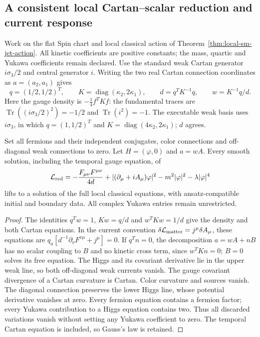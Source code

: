 \subsection{A consistent local Cartan--scalar reduction and current response}
\label{sec:cartan-scalar-reduction}

Work on the flat Spin chart and local classical action of
Theorem~\ref{thm:local-sm-jet-action}. All kinetic coefficients are positive
constants; the mass, quartic and Yukawa coefficients remain declared. Use
the standard weak Cartan generator $i\sigma_3/2$ and central generator $i$.
Writing the two real Cartan connection coordinates as $a=(a_2,a_1)$ gives
\[
 q=(1/2,1/2)^T,\qquad K=\operatorname{diag}(\kappa_2,2\kappa_1),\qquad
 d=q^TK^{-1}q,\qquad w=K^{-1}q/d.
\]
Here the gauge density is $-\tfrac14 f^TKf$: the fundamental traces are
$\operatorname{Tr}((i\sigma_3/2)^2)=-1/2$ and $\operatorname{Tr}(i^2)=-1$.
The executable weak basis uses $i\sigma_3$, in which
$q=(1,1/2)^T$ and $K=\operatorname{diag}(4\kappa_2,2\kappa_1)$; $d$ agrees.

\begin{theorem}
\label{thm:cartan-scalar-reduction}
Set all fermions and their independent conjugates, color connections and
off-diagonal weak connections to zero. Let $H=(\varphi,0)$ and $a=wA$.
Every smooth solution, including the temporal gauge equation, of
\begin{equation}
 \mathcal L_{\rm red}=-\frac{F_{\mu\nu}F^{\mu\nu}}{4d}
  +| (\partial_\mu+iA_\mu)\varphi|^2
  -m^2|\varphi|^2-\lambda|\varphi|^4
 \label{eq:cartan-reduced-action}
\end{equation}
lifts to a solution of the full local classical equations, with
ansatz-compatible initial and boundary data. All complex Yukawa entries
remain unrestricted.
\end{theorem}
\begin{proof}
The identities $q^Tw=1$, $Kw=q/d$ and $w^TKw=1/d$ give the density and both
Cartan equations. In the current convention
$\delta\mathcal L_{\rm matter}=j^\mu\delta A_\mu$, these equations are
$q_a[d^{-1}\partial_\nu F^{\nu\mu}+j^\mu]=0$.
If $q^Tn=0$, the decomposition $a=wA+nB$ has no scalar coupling to $B$ and
no kinetic cross term, since $w^TKn=0$; $B=0$ solves its free equation.
The Higgs and its covariant derivative lie in the upper weak line, so both
off-diagonal weak currents vanish. The gauge covariant divergence of a
Cartan curvature is Cartan. Color curvature and sources vanish. The
diagonal connection preserves the lower Higgs line, whose potential
derivative vanishes at zero. Every fermion equation contains a fermion
factor; every Yukawa contribution to a Higgs equation contains two. Thus
all discarded variations vanish without setting any Yukawa coefficient to
zero. The temporal Cartan equation is included, so Gauss's law is retained.
\end{proof}

